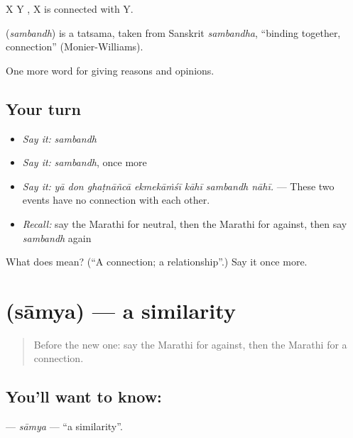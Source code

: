 X  Y   , X is connected with Y.

\begin{cousinweb}
\textbf{} (\emph{sambandh}) is a tatsama, taken from Sanskrit \emph{sambandha}, \textquotedblleft{}binding together, connection\textquotedblright{} (Monier-Williams).
\end{cousinweb}

\begin{grammarlens}[title={What you've built}]
One more word for giving reasons and opinions.
\end{grammarlens}

\subsection*{Your turn}
\begin{itemize}
\raggedright
  \item \emph{Say it:} \emph{sambandh}
  \item \emph{Say it:} \emph{sambandh}, once more
  \item \emph{Say it:} \emph{yā don ghaṭnāñcā ekmekāṁśī kāhī sambandh nāhī.} — These two events have no connection with each other.
  \item \emph{Recall:} say the Marathi for neutral, then the Marathi for against, then say \emph{sambandh} again
\end{itemize}

\begin{tcolorbox}[breakable,colback=teal!4,colframe=teal!35!black,title={Before you move on}]
What does  mean? (\textquotedblleft{}A connection; a relationship\textquotedblright{}.) Say it once more.
\end{tcolorbox}
\section[\texorpdfstring{\mr{साम्य} (sāmya)}{साम्य (sāmya)}]{ (sāmya) — a similarity}

\label{lesson:MR-C348-samya}



\begin{quote}
Before the new one: say the Marathi for against, then the Marathi for a connection.
\end{quote}

\subsection*{You'll want to know: }
\textbf{} — \emph{sāmya} — \textquotedblleft{}a similarity\textquotedblright{}.

